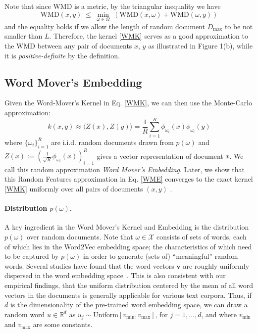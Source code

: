 \documentclass[11pt,a4paper]{article}
\newcommand{\1}{\boldsymbol{1}}
\newcommand{\bv}{\boldsymbol{v}}
\newcommand{\WMD}{\text{WMD}}
\begin{document}
Note that since WMD is a metric, by the triangular inequality we have
\begin{equation*}\label{tri_ineq}
\WMD(x,y) \;\leq\;\min_{\omega\in \Omega}\; \left(\WMD(x,\omega)+\WMD(\omega,y)\right)
\end{equation*}
and the equality holds if we allow the length of random document $D_{\max}$ to be not smaller than $L$. Therefore, the kernel \eqref{WMK} serves as a good approximation to the WMD between any pair of documents $x$, $y$ as illustrated in Figure 1(b), while it is \emph{positive-definite} by the definition.

\subsection{Word Mover's Embedding}

Given the Word-Mover's Kernel in Eq. \eqref{WMK}, we can then use the Monte-Carlo approximation:
\begin{equation}\label{WME}
k(x,y) \approx \langle Z(x), Z(y) \rangle = \frac{1}{R}\sum_{i=1}^R \phi_{\omega_i}(x)\phi_{\omega_i}(y) 
\end{equation}
where $\{\omega_i\}_{i=1}^R$ are i.i.d. random documents drawn from $p(\omega)$ and $Z(x):=(\frac{1}{\sqrt{R}}\phi_{\omega_i}(x))_{i=1}^R$ gives a vector representation of document $x$. We call this random approximation \emph{Word Mover's Embedding}. Later, we show that this Random Features approximation in Eq. \eqref{WME} converges to the exact kernel \eqref{WMK} uniformly over all pairs of documents $(x,y)$ . 

\paragraph{Distribution $p(\omega)$.}
A key ingredient in the Word Mover's Kernel and Embedding is the distribution $p(\omega)$ over random documents. Note that $\omega \in \mathcal{X}$ consists of sets of words, each of which lies in the Word2Vec embedding space; the characteristics of which need to be captured by $p(\omega)$ in order to generate (sets of) ``meaningful'' random words. Several studies have found that the word vectors $\bv$ are roughly uniformly dispersed in the word embedding space~\cite{arora2016latent,arora2017simple}. This is also consistent with our empirical findings, that the uniform distribution centered by the mean of all word vectors in the documents is generally applicable for various text corpora. Thus, if $d$ is the dimensionality of the pre-trained word embedding space, we can draw a random word $u \in \mathbb{R}^d$ as $u_j \sim \text{Uniform}[v_{\min},v_{\max}]$, for $j = 1,\hdots,d$, and where $v_{\min}$ and $v_{\max}$ are some constants.
\end{document}
